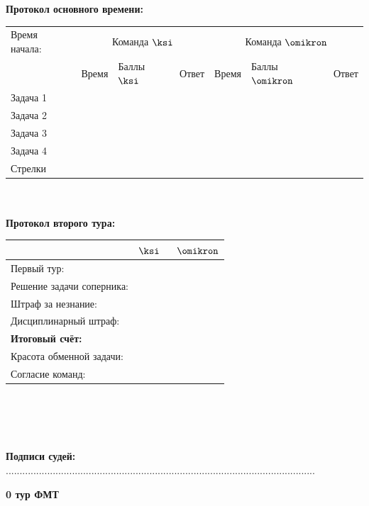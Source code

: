 \documentclass[12pt]{article}
\begin{document}
\begin{center}{\bf Протокол основного времени: } \\ 
\begin{tabular}{|p{3.3cm}|p{1.5cm}|p{2cm}|p{1.5cm}|p{1.5cm}|p{2cm}|p{1.5cm}|}
\hline Время начала: & \multicolumn{3}{c|}{Команда $\ksi$} & \multicolumn{3}{c|}{Команда $\omikron$ }\\\cline{2-7} {} & Время & Баллы $\ksi$ & Ответ & Время & Баллы $\omikron$ & Ответ \\\hline \hline \center Задача 1 &{}&{}&{}&{}&{}&{}\\[20mm]\hline \hline \center Задача 2 &{}&{}&{}&{}&{}&{}\\[20mm]\hline \hline \center Задача 3 &{}&{}&{}&{}&{}&{}\\[20mm]\hline \hline \center Задача 4 &{}&{}&{}&{}&{}&{}\\[20mm]\hline \hline \center Стрелки &{}&{}&{}&{}&{}&{}\\[20mm]\hline
\end{tabular}
$ $\\
$ $\\
{\bf Протокол второго тура: } \\ 
\begin{tabular}{ | p{7cm} | p{1cm} | p{1cm} |}
\hline
$ $ & \centering $\ksi$ & $\;$ $\omikron$ \\ \hline\raggedleft Первый тур: & & \\ \hline\raggedleft Решение задачи соперника: & & \\ \hline\raggedleft Штраф за незнание: & & \\ \hline\raggedleft Дисциплинарный штраф: & & \\ \hline\raggedleft \bf Итоговый счёт: & & \\ \hline \hline\raggedleft Красота обменной задачи: & & \\ \hline\raggedleft Согласие команд: & & \\ \hline\end{tabular}\end{center}
$ $\\
$ $\\
$ $\\
$ $\\
{\bf Подписи судей: }................................................................................................................\newpage
\begin{center}
{\Huge \bf 0 тур ФМТ}
\end{center}
\end{document}
